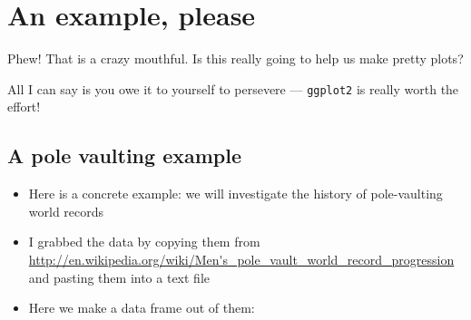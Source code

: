 \documentclass[]{book}
\newenvironment{Shaded}{\begin{snugshade}}{\end{snugshade}}
\newcommand{\KeywordTok}[1]{\textcolor[rgb]{0.13,0.29,0.53}{\textbf{{#1}}}}
\newcommand{\DataTypeTok}[1]{\textcolor[rgb]{0.13,0.29,0.53}{{#1}}}
\newcommand{\CharTok}[1]{\textcolor[rgb]{0.31,0.60,0.02}{{#1}}}
\newcommand{\StringTok}[1]{\textcolor[rgb]{0.31,0.60,0.02}{{#1}}}
\newcommand{\CommentTok}[1]{\textcolor[rgb]{0.56,0.35,0.01}{\textit{{#1}}}}
\newcommand{\NormalTok}[1]{{#1}}
\providecommand{\tightlist}{%
  \setlength{\itemsep}{0pt}\setlength{\parskip}{0pt}}
\theoremstyle{definition}
\theoremstyle{definition}
\theoremstyle{remark}
\begin{document}
\section{An example, please}\label{pv-example}

Phew! That is a crazy mouthful. Is this really going to help us make
pretty plots?

All I can say is you owe it to yourself to persevere ---
\texttt{ggplot2} is really worth the effort!

\subsection{A pole vaulting example}\label{a-pole-vaulting-example}

\begin{itemize}
\tightlist
\item
  Here is a concrete example: we will investigate the history of
  pole-vaulting world records
\item
  I grabbed the data by copying them from
  \url{http://en.wikipedia.org/wiki/Men's_pole_vault_world_record_progression}
  and pasting them into a text file
\item
  Here we make a data frame out of them:
\end{itemize}

\begin{Shaded}
\end{Shaded}
\end{document}
